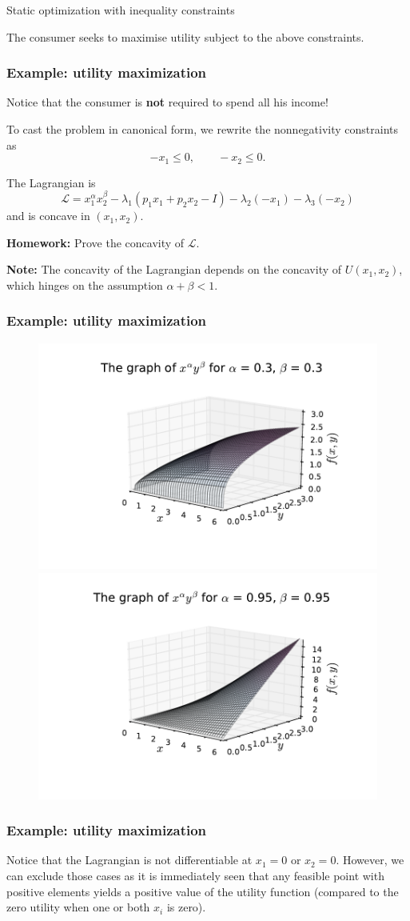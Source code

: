 \documentclass[10pt]{beamer}
\theoremstyle{definition}
\begin{document}
\begin{section}{Static optimization with inequality constraints}
\begin{frame}[fragile]
The consumer seeks to maximise utility subject to the above constraints.
\end{frame}

\begin{frame}[fragile]
\frametitle{Example: utility maximization}
Notice that the consumer is \textbf{not} required to spend all his income!\bigskip

To cast the problem in canonical form, we rewrite the nonnegativity constraints as
\[ -x_1\leq 0 , \qquad -x_2 \leq 0. \] \bigskip

The Lagrangian is \[ \mathcal{L} = x_1^\alpha x_2^\beta - \lambda_1 ( p_1 x_1 + p_2 x_2 - I) -\lambda_2 (-x_1) - \lambda_3 (-x_2) \] and is {\color{red}concave} in $ (x_1,x_2) $.\bigskip

\textbf{Homework:} Prove the concavity of $ \mathcal{L} $.\bigskip

\textbf{Note: }The concavity of the Lagrangian depends on the concavity of $ U(x_1,x_2) $, which hinges on the assumption $ \alpha+\beta < 1 $.
\end{frame}

\begin{frame}[fragile]
\frametitle{Example: utility maximization}
\begin{figure}
\centering
\includegraphics[width=0.5\linewidth]{ConcF}
\includegraphics[width=0.5\linewidth]{NonConcF}
\end{figure}
\end{frame}

\begin{frame}[fragile]
\frametitle{Example: utility maximization}
Notice that the Lagrangian is not differentiable at $ x_1=0 $ or $ x_2=0 $. However, we can exclude those cases as it is immediately seen that any feasible point with positive elements yields a positive value of the utility function (compared to the zero utility when one or both $ x_i $ is zero).\bigskip


\end{frame}
\end{section}
\end{document}
